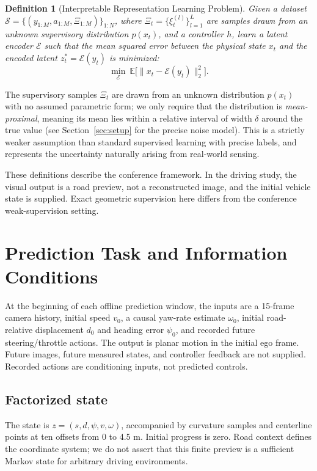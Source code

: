 \documentclass[preprint,12pt]{elsarticle}
\newtheorem{definition}{Definition}
\newcommand{\zstar}{z^{*}}   %
\begin{document}
\begin{definition}[Interpretable Representation Learning Problem]
Given a dataset $\mathcal{S} = \{(y_{1:M}, a_{1:M}, \Xi_{1:M})\}_{1:N}$,
where $\Xi_t = \{\xi^{(l)}_t\}_{l=1}^L$ are samples drawn from an unknown
supervisory distribution $p(x_t)$, and a controller $h$, learn a latent encoder
$\mathcal{E}$ such that the mean squared error between the physical state $x_t$
and the encoded latent $\zstar_t = \mathcal{E}(y_t)$ is minimized:
\begin{equation}
    \min_{\mathcal{E}} \ \mathbb{E} \big[ \| x_t - \mathcal{E}(y_t) \|_2^2 \big].
\end{equation}
\end{definition}

The supervisory samples $\Xi_t$ are drawn from an unknown distribution $p(x_t)$
with no assumed parametric form; we only require that the distribution is
\emph{mean-proximal}, meaning its mean lies within a relative interval of width
$\delta$ around the true value (see Section~\ref{sec:setup} for the precise noise
model).
This is a strictly weaker assumption than standard supervised learning with
precise labels, and represents the uncertainty naturally arising from real-world
sensing.


These definitions describe the conference framework. In the driving study,
the visual output is a road preview, not a reconstructed image, and the initial
vehicle state is supplied. Exact geometric supervision here differs from the
conference weak-supervision setting.

\section{Prediction Task and Information Conditions}\label{sec:problem}
At the beginning of each offline prediction window, the inputs are a 15-frame
camera history, initial speed $v_0$, a causal yaw-rate estimate $\omega_0$,
initial road-relative displacement $d_0$ and heading error $\psi_0$, and recorded
future steering/throttle actions. The output is planar motion in the initial
ego frame. Future images, future measured states, and controller feedback are
not supplied. Recorded actions are conditioning inputs, not predicted controls.

\subsection{Factorized state}\label{sec:factorized_state}
The state is $z=(s,d,\psi,v,\omega)$, accompanied by curvature samples and
centerline points at ten offsets from 0 to 4.5 m. Initial progress is zero.
Road context defines the coordinate system; we do not assert that this finite
preview is a sufficient Markov state for arbitrary driving environments.
\end{document}
